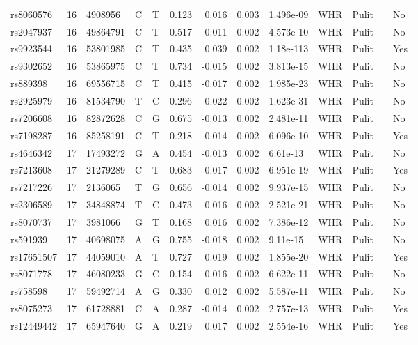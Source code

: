\documentclass[11pt,twoside]{bristolthesis}
\begin{document}
\begin{longtable}[t]{lrlllrrrlllll}
rs8060576 & 16 & 4908956 & C & T & 0.123 & 0.016 & 0.003 & 1.496e-09 & WHR & Pulit &  & No\\
rs2047937 & 16 & 49864791 & C & T & 0.517 & -0.011 & 0.002 & 4.573e-10 & WHR & Pulit &  & No\\
rs9923544 & 16 & 53801985 & C & T & 0.435 & 0.039 & 0.002 & 1.18e-113 & WHR & Pulit &  & Yes\\
rs9302652 & 16 & 53865975 & C & T & 0.734 & -0.015 & 0.002 & 3.813e-15 & WHR & Pulit &  & No\\
\addlinespace
rs889398 & 16 & 69556715 & C & T & 0.415 & -0.017 & 0.002 & 1.985e-23 & WHR & Pulit &  & No\\
rs2925979 & 16 & 81534790 & T & C & 0.296 & 0.022 & 0.002 & 1.623e-31 & WHR & Pulit &  & No\\
rs7206608 & 16 & 82872628 & C & G & 0.675 & -0.013 & 0.002 & 2.481e-11 & WHR & Pulit &  & No\\
rs7198287 & 16 & 85258191 & C & T & 0.218 & -0.014 & 0.002 & 6.096e-10 & WHR & Pulit &  & Yes\\
rs4646342 & 17 & 17493272 & G & A & 0.454 & -0.013 & 0.002 & 6.61e-13 & WHR & Pulit &  & No\\
\addlinespace
rs7213608 & 17 & 21279289 & C & T & 0.683 & -0.017 & 0.002 & 6.951e-19 & WHR & Pulit &  & Yes\\
rs7217226 & 17 & 2136065 & T & G & 0.656 & -0.014 & 0.002 & 9.937e-15 & WHR & Pulit &  & No\\
rs2306589 & 17 & 34848874 & T & C & 0.473 & 0.016 & 0.002 & 2.521e-21 & WHR & Pulit &  & No\\
rs8070737 & 17 & 3981066 & G & T & 0.168 & 0.016 & 0.002 & 7.386e-12 & WHR & Pulit &  & No\\
rs591939 & 17 & 40698075 & A & G & 0.755 & -0.018 & 0.002 & 9.11e-15 & WHR & Pulit &  & No\\
\addlinespace
rs17651507 & 17 & 44059010 & A & T & 0.727 & 0.019 & 0.002 & 1.855e-20 & WHR & Pulit &  & Yes\\
rs8071778 & 17 & 46080233 & G & C & 0.154 & -0.016 & 0.002 & 6.622e-11 & WHR & Pulit &  & No\\
rs758598 & 17 & 59492714 & A & G & 0.330 & 0.012 & 0.002 & 5.587e-11 & WHR & Pulit &  & No\\
rs8075273 & 17 & 61728881 & C & A & 0.287 & -0.014 & 0.002 & 2.757e-13 & WHR & Pulit &  & Yes\\
rs12449442 & 17 & 65947640 & G & A & 0.219 & 0.017 & 0.002 & 2.554e-16 & WHR & Pulit &  & Yes\\
\addlinespace

\end{longtable}
\end{document}
